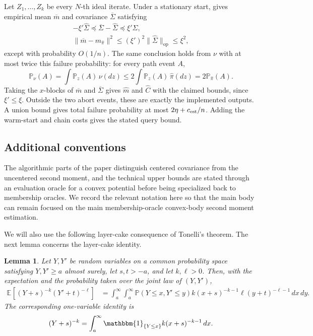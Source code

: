 \documentclass[11pt]{article}
\numberwithin{equation}{section}
\newtheorem{lemma}{Lemma}[section]
\theoremstyle{definition}
\newcommand{\E}[2]{\mathbb{E}_{#1}\left[#2\right]}
\newcommand{\op}{\mathrm{op}}
\newcommand{\ind}{\mathbbm{1}}
\begin{document}
Let $Z_1,\ldots,Z_k$ be every $N$-th ideal iterate.
Under a stationary start, \cite[Lemma~4.6]{KV25} gives empirical mean
$\overline m$ and covariance $\overline\Sigma$ satisfying
\[
 \begin{gathered}
 -\xi'\widehat\Sigma\preceq\overline\Sigma-\widehat\Sigma
 \preceq\xi'\widehat\Sigma,\\
 \|\overline m-m_{\widehat\pi}\|^2
 \leq(\xi')^2\|\widehat\Sigma\|_{\op}\leq\xi^2,
 \end{gathered}
\]
except with probability $O(1/n)$.
The same conclusion holds from $\nu$ with at most twice this failure
probability: for every path event $A$,
\[
 \mathbb P_\nu(A)=\int\mathbb P_z(A)\,\nu(dz)
 \leq2\int\mathbb P_z(A)\,\widehat\pi(dz)
 =2\mathbb P_{\widehat\pi}(A).
\]
Taking the $x$-blocks of $\overline m$ and $\overline\Sigma$ gives
$\widehat m$ and $\widehat C$ with the claimed bounds, since $\xi'\leq\xi$.
Outside the two abort events, these are exactly the implemented outputs.
A union bound gives total failure probability at most $2\eta+c_{\rm est}/n$.
Adding the warm-start and chain costs gives the stated query bound.

\subsection{Additional conventions}

The algorithmic parts of the paper distinguish centered covariance from the
uncentered second moment, and the technical upper bounds are stated through an
evaluation oracle for a convex potential before being specialized back to
membership oracles.
We record the relevant notation here so that the main body can remain focused on
the main membership-oracle convex-body second moment estimation.

We will also use the following layer-cake consequence of Tonelli's theorem.
The next lemma concerns the layer-cake identity.

\begin{lemma}
\label{lem:layer-cake}
Let $Y,Y'$ be random variables on a common probability space satisfying
$Y,Y'\ge a$ almost surely, let
$s,t>-a$, and let
$k,\ell>0$.
Then, with the expectation and the probability taken over the joint law of
$(Y,Y')$,
\begin{align*}
\E{}{(Y+s)^{-k}(Y'+t)^{-\ell}}
&=\int_a^\infty\!\!\int_a^\infty
 \mathbb P(Y\le x,Y'\le y)
 k(x+s)^{-k-1}\ell(y+t)^{-\ell-1}\,dx\,dy.
\end{align*}
The corresponding one-variable identity is
\[
(Y+s)^{-k}=\int_a^\infty
\ind_{\{Y\le x\}}k(x+s)^{-k-1}\,dx.
\]
\end{lemma}
\end{document}
